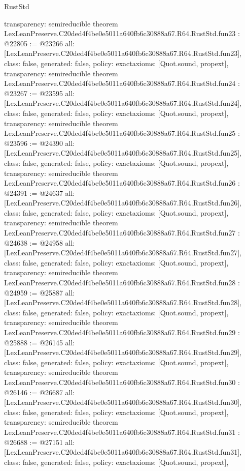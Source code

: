 \begin{lexlean}{RustStd}
\begin{coremodule}
{  transparency: semireducible
}
theorem LexLeanPreserve.C20ded4f4be0e5011a640fb6c30888a67.R64.RustStd.fun23 : @22805 := @23266 {
  all: [LexLeanPreserve.C20ded4f4be0e5011a640fb6c30888a67.R64.RustStd.fun23],
  class: false,
  generated: false,
  policy: exact{axioms: [Quot.sound, propext]},
  transparency: semireducible
}
theorem LexLeanPreserve.C20ded4f4be0e5011a640fb6c30888a67.R64.RustStd.fun24 : @23267 := @23595 {
  all: [LexLeanPreserve.C20ded4f4be0e5011a640fb6c30888a67.R64.RustStd.fun24],
  class: false,
  generated: false,
  policy: exact{axioms: [Quot.sound, propext]},
  transparency: semireducible
}
theorem LexLeanPreserve.C20ded4f4be0e5011a640fb6c30888a67.R64.RustStd.fun25 : @23596 := @24390 {
  all: [LexLeanPreserve.C20ded4f4be0e5011a640fb6c30888a67.R64.RustStd.fun25],
  class: false,
  generated: false,
  policy: exact{axioms: [Quot.sound, propext]},
  transparency: semireducible
}
theorem LexLeanPreserve.C20ded4f4be0e5011a640fb6c30888a67.R64.RustStd.fun26 : @24391 := @24637 {
  all: [LexLeanPreserve.C20ded4f4be0e5011a640fb6c30888a67.R64.RustStd.fun26],
  class: false,
  generated: false,
  policy: exact{axioms: [Quot.sound, propext]},
  transparency: semireducible
}
theorem LexLeanPreserve.C20ded4f4be0e5011a640fb6c30888a67.R64.RustStd.fun27 : @24638 := @24958 {
  all: [LexLeanPreserve.C20ded4f4be0e5011a640fb6c30888a67.R64.RustStd.fun27],
  class: false,
  generated: false,
  policy: exact{axioms: [Quot.sound, propext]},
  transparency: semireducible
}
theorem LexLeanPreserve.C20ded4f4be0e5011a640fb6c30888a67.R64.RustStd.fun28 : @24959 := @25887 {
  all: [LexLeanPreserve.C20ded4f4be0e5011a640fb6c30888a67.R64.RustStd.fun28],
  class: false,
  generated: false,
  policy: exact{axioms: [Quot.sound, propext]},
  transparency: semireducible
}
theorem LexLeanPreserve.C20ded4f4be0e5011a640fb6c30888a67.R64.RustStd.fun29 : @25888 := @26145 {
  all: [LexLeanPreserve.C20ded4f4be0e5011a640fb6c30888a67.R64.RustStd.fun29],
  class: false,
  generated: false,
  policy: exact{axioms: [Quot.sound, propext]},
  transparency: semireducible
}
theorem LexLeanPreserve.C20ded4f4be0e5011a640fb6c30888a67.R64.RustStd.fun30 : @26146 := @26687 {
  all: [LexLeanPreserve.C20ded4f4be0e5011a640fb6c30888a67.R64.RustStd.fun30],
  class: false,
  generated: false,
  policy: exact{axioms: [Quot.sound, propext]},
  transparency: semireducible
}
theorem LexLeanPreserve.C20ded4f4be0e5011a640fb6c30888a67.R64.RustStd.fun31 : @26688 := @27151 {
  all: [LexLeanPreserve.C20ded4f4be0e5011a640fb6c30888a67.R64.RustStd.fun31],
  class: false,
  generated: false,
  policy: exact{axioms: [Quot.sound, propext]},
}
\end{coremodule}
\end{lexlean}
